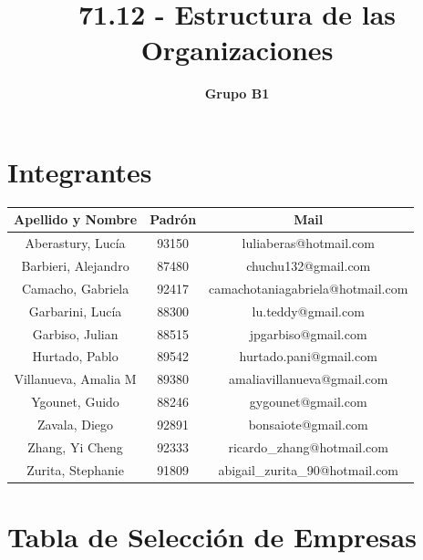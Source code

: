 \documentclass[a4paper,10pt,titlepage]{article}
\title{71.12 - Estructura de las Organizaciones}
\author{\textbf{Grupo B1}}
\begin{document}
\pagestyle{fancy}
\maketitle

\tableofcontents
\newpage


\section{Integrantes}
\begin{center}
  \begin{tabular}{ | c | c | c | }
    \hline 
      \textbf{Apellido y Nombre} & \textbf{Padrón} & \textbf{Mail} \\ \hline
      Aberastury, Lucía & 93150 & luliaberas@hotmail.com \\ \hline
      Barbieri, Alejandro & 87480 & chuchu132@gmail.com \\ \hline
      Camacho, Gabriela & 92417 & camachotaniagabriela@hotmail.com  \\ \hline
      Garbarini, Lucía & 88300 & lu.teddy@gmail.com \\ \hline
      Garbiso, Julian & 88515 & jpgarbiso@gmail.com \\ \hline
      Hurtado, Pablo & 89542 & hurtado.pani@gmail.com \\ \hline
      Villanueva, Amalia M & 89380 & amaliavillanueva@gmail.com \\ \hline
      Ygounet, Guido & 88246 & gygounet@gmail.com \\ \hline
      Zavala, Diego & 92891 & bonsaiote@gmail.com  \\ \hline
      Zhang, Yi Cheng & 92333 & ricardo\_zhang@hotmail.com \\ \hline
      Zurita, Stephanie & 91809 & abigail\_zurita\_90@hotmail.com \\
    \hline
  \end{tabular}
\end{center}
\newpage

\section{Tabla de Selecci\'on de Empresas}
\end{document}
